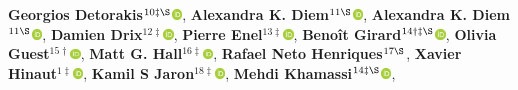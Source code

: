 \textbf{Georgios Detorakis}$^{10\ddagger\S}$\href{http://orcid.org/0000-0001-5891-1702}{\includegraphics[width=8pt]{orcid}},
\textbf{Alexandra K. Diem}$^{11\S}$\href{http://orcid.org/0000-0003-1719-1942}{\includegraphics[width=8pt]{orcid}},
\textbf{Alexandra K. Diem}$^{11\S}$\href{http://orcid.org/0000-0003-1719-1942}{\includegraphics[width=8pt]{orcid}},
\textbf{Damien Drix}$^{12\ddagger}$\href{http://orcid.org/0000-0003-4107-5693}{\includegraphics[width=8pt]{orcid}},
\textbf{Pierre Enel}$^{13\ddagger}$\href{http://orcid.org/0000-0001-8983-6223}{\includegraphics[width=8pt]{orcid}},
\textbf{Benoît Girard}$^{14\dagger\ddagger\S}$\href{http://orcid.org/0000-0002-8117-7064}{\includegraphics[width=8pt]{orcid}},
\textbf{Olivia Guest}$^{15\dagger}$\href{http://orcid.org/0000-0002-1891-0972}{\includegraphics[width=8pt]{orcid}},
\textbf{Matt G. Hall}$^{16\ddagger}$\href{http://orcid.org/0000-0002-9530-5477}{\includegraphics[width=8pt]{orcid}},
\textbf{Rafael Neto Henriques}$^{17\S}$,
\textbf{Xavier Hinaut}$^{1\ddagger}$\href{http://orcid.org/0000-0002-1924-1184}{\includegraphics[width=8pt]{orcid}},
\textbf{Kamil S Jaron}$^{18\ddagger}$\href{http://orcid.org/0000-0003-1470-5450}{\includegraphics[width=8pt]{orcid}},
\textbf{Mehdi Khamassi}$^{14\ddagger\S}$\href{http://orcid.org/0000-0002-2515-1046}{\includegraphics[width=8pt]{orcid}},
